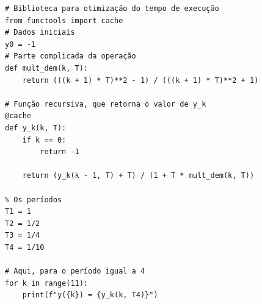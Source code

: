 \documentclass[10pt]{article}
\begin{document}
\begin{verbatim}
# Biblioteca para otimização do tempo de execução
from functools import cache
# Dados iniciais
y0 = -1
# Parte complicada da operação
def mult_dem(k, T):
    return (((k + 1) * T)**2 - 1) / (((k + 1) * T)**2 + 1)

# Função recursiva, que retorna o valor de y_k
@cache
def y_k(k, T):
    if k == 0:
        return -1
    
    return (y_k(k - 1, T) + T) / (1 + T * mult_dem(k, T))

% Os períodos
T1 = 1
T2 = 1/2
T3 = 1/4
T4 = 1/10

# Aqui, para o período igual a 4
for k in range(11):
    print(f"y({k}) = {y_k(k, T4)}")
\end{verbatim}
\end{document}
